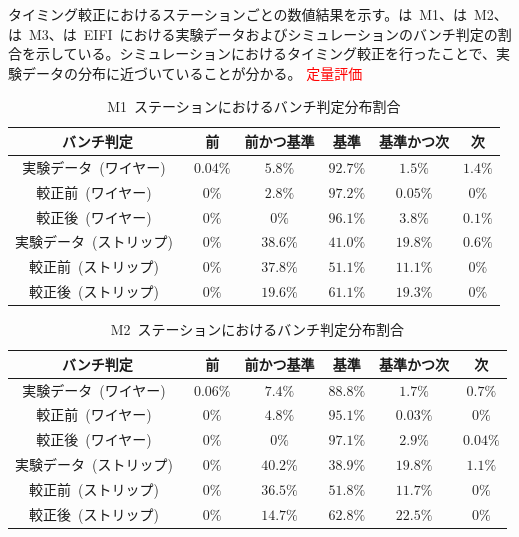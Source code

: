 タイミング較正におけるステーションごとの数値結果を示す。は~M1、は~M2、は~M3、は~EIFI~における実験データおよびシミュレーションのバンチ判定の割合を示している。シミュレーションにおけるタイミング較正を行ったことで、実験データの分布に近づいていることが分かる。
\textcolor{red}{定量評価}
\begin{table}[htb]
	\centering
	\begin{tabular}{c|c|c|c|c|c}\hline
	バンチ判定&前&前かつ基準&基準&基準かつ次&次 \\ \hline\hline
	実験データ~(ワイヤー)~& $0.04\%$ & $5.8\%$ & $92.7\%$ & $1.5\%$ & $1.4\%$ \\
	較正前~(ワイヤー)~& $0\%$ & $2.8\%$ & $97.2\%$ & $0.05\%$ & $0\%$ \\ 
	較正後~(ワイヤー)~& $0\%$ & $0\%$ & $96.1\%$ & $3.8\%$ & $0.1\%$ \\ \hline
	実験データ~(ストリップ)~& $0\%$ & $38.6\%$ & $41.0\%$ & $19.8\%$ & $0.6\%$ \\
	較正前~(ストリップ)~& $0\%$ & $37.8\%$ & $51.1\%$ & $11.1\%$ & $0\%$ \\
	較正後~(ストリップ)~& $0\%$ & $19.6\%$ & $61.1\%$ & $19.3\%$ & $0\%$ \\ \hline
	\end{tabular}
	\caption{M1~ステーションにおけるバンチ判定分布割合}\label{tb:tunebcidM1}
\end{table}

\begin{table}[htb]
	\centering
	\begin{tabular}{c|c|c|c|c|c}\hline
	バンチ判定&前&前かつ基準&基準&基準かつ次&次 \\ \hline\hline
	実験データ~(ワイヤー)~& $0.06\%$ & $7.4\%$ & $88.8\%$ & $1.7\%$ & $0.7\%$ \\
	較正前~(ワイヤー)~& $0\%$ & $4.8\%$ & $95.1\%$ & $0.03\%$ & $0\%$ \\ 
	較正後~(ワイヤー)~& $0\%$ & $0\%$ & $97.1\%$ & $2.9\%$ & $0.04\%$ \\ \hline
	実験データ~(ストリップ)~& $0\%$ & $40.2\%$ & $38.9\%$ & $19.8\%$ & $1.1\%$ \\
	較正前~(ストリップ)~& $0\%$ & $36.5\%$ & $51.8\%$ & $11.7\%$ & $0\%$ \\
	較正後~(ストリップ)~& $0\%$ & $14.7\%$ & $62.8\%$ & $22.5\%$ & $0\%$ \\ \hline
	\end{tabular}
	\caption{M2~ステーションにおけるバンチ判定分布割合}\label{tb:tunebcidM2}
\end{table}

